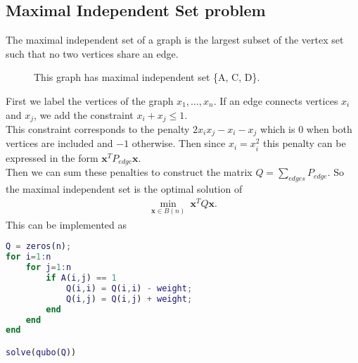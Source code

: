 \documentclass{article}
\begin{document}
\subsection{Maximal Independent Set problem}

\noindent The maximal independent set of a graph is the largest subset of the vertex set such that no two vertices share an edge. 

\begin{figure}[H]
    \centering
    \caption{This graph has maximal independent set \{A, C, D\}.}
\end{figure}

\noindent First we label the vertices of the graph \(x_1, \dots,  x_n\). If an edge connects vertices \(x_i\) and \(x_j\), we add the constraint \(x_i + x_j \leq 1\). \\

\noindent This constraint corresponds to the penalty \(2x_ix_j - x_i - x_j\) which is \(0\) when both vertices are included and \(-1\) otherwise. Then since \(x_i = x_i^2\) this penalty can be expressed in the form \(\mathbf{x}^T P_{edge}\mathbf{x}\). \\

\noindent Then we can sum these penalties to construct the matrix \(Q = \sum\limits_{edges} P_{edge}\). So the maximal independent set is the optimal solution of
\begin{align*}
    \min_{\mathbf{x} \in B(n)} \: \mathbf{x}^T Q \mathbf{x}.
\end{align*}
\noindent This can be implemented as
\begin{lstlisting}[language=MATLAB]
Q = zeros(n);
for i=1:n
    for j=1:n
        if A(i,j) == 1
            Q(i,i) = Q(i,i) - weight;
            Q(i,j) = Q(i,j) + weight;
        end
    end
end

solve(qubo(Q))
\end{lstlisting}
\end{document}
